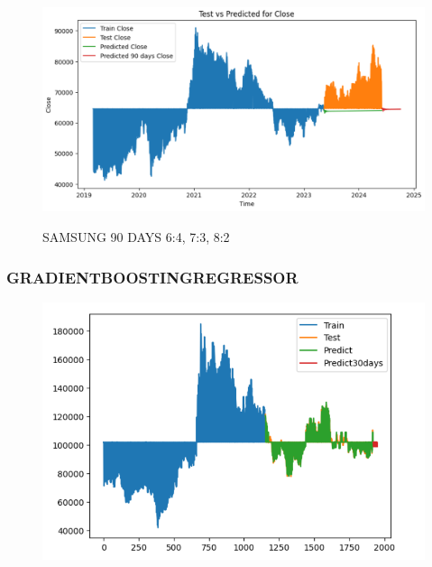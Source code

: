 \documentclass{article}
\begin{document}
\begin{multicols}{2}
\begin{figure}[H]
\begin{minipage}{0.15\textwidth}
    \label{fig:2}
    \end{minipage}%
    \begin{minipage}{0.15\textwidth}
    \centering
    \includegraphics[width=1\textwidth]{Image/VARMA/SAMSUNG/8_2/90.png}

    \label{fig:3}
    \end{minipage}
    \caption{SAMSUNG 90 DAYS  6:4, 7:3, 8:2 }
\end{figure}

\subsubsection{GRADIENTBOOSTINGREGRESSOR}
\begin{figure}[H]
    \centering
    \begin{minipage}{0.15\textwidth}
    \centering
    \includegraphics[width=1\textwidth]{Image/GradientBoosting/LG_30_6_4_GradientBoostingRegressor.png}
   

\end{minipage}
\end{figure}
\end{multicols}
\end{document}
